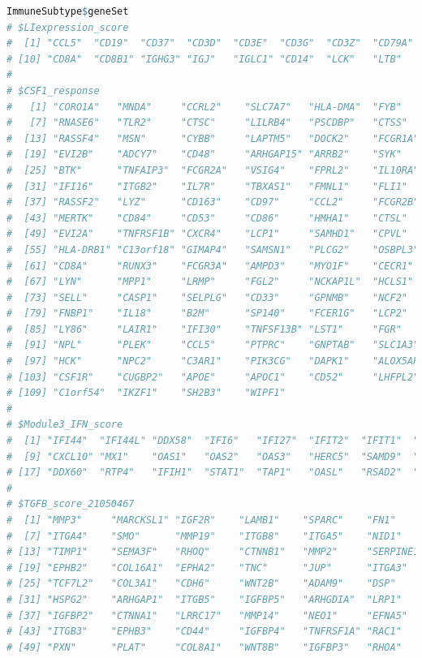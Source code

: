\documentclass[
  12pt,
]{book}
\begin{document}
\begin{lstlisting}[language=R]
ImmuneSubtype$geneSet
# $LIexpression_score
#  [1] "CCL5"  "CD19"  "CD37"  "CD3D"  "CD3E"  "CD3G"  "CD3Z"  "CD79A" "CD79B"
# [10] "CD8A"  "CD8B1" "IGHG3" "IGJ"   "IGLC1" "CD14"  "LCK"   "LTB"   "MS4A1"
# 
# $CSF1_response
#   [1] "CORO1A"   "MNDA"     "CCRL2"    "SLC7A7"   "HLA-DMA"  "FYB"     
#   [7] "RNASE6"   "TLR2"     "CTSC"     "LILRB4"   "PSCDBP"   "CTSS"    
#  [13] "RASSF4"   "MSN"      "CYBB"     "LAPTM5"   "DOCK2"    "FCGR1A"  
#  [19] "EVI2B"    "ADCY7"    "CD48"     "ARHGAP15" "ARRB2"    "SYK"     
#  [25] "BTK"      "TNFAIP3"  "FCGR2A"   "VSIG4"    "FPRL2"    "IL10RA"  
#  [31] "IFI16"    "ITGB2"    "IL7R"     "TBXAS1"   "FMNL1"    "FLI1"    
#  [37] "RASSF2"   "LYZ"      "CD163"    "CD97"     "CCL2"     "FCGR2B"  
#  [43] "MERTK"    "CD84"     "CD53"     "CD86"     "HMHA1"    "CTSL"    
#  [49] "EVI2A"    "TNFRSF1B" "CXCR4"    "LCP1"     "SAMHD1"   "CPVL"    
#  [55] "HLA-DRB1" "C13orf18" "GIMAP4"   "SAMSN1"   "PLCG2"    "OSBPL3"  
#  [61] "CD8A"     "RUNX3"    "FCGR3A"   "AMPD3"    "MYO1F"    "CECR1"   
#  [67] "LYN"      "MPP1"     "LRMP"     "FGL2"     "NCKAP1L"  "HCLS1"   
#  [73] "SELL"     "CASP1"    "SELPLG"   "CD33"     "GPNMB"    "NCF2"    
#  [79] "FNBP1"    "IL18"     "B2M"      "SP140"    "FCER1G"   "LCP2"    
#  [85] "LY86"     "LAIR1"    "IFI30"    "TNFSF13B" "LST1"     "FGR"     
#  [91] "NPL"      "PLEK"     "CCL5"     "PTPRC"    "GNPTAB"   "SLC1A3"  
#  [97] "HCK"      "NPC2"     "C3AR1"    "PIK3CG"   "DAPK1"    "ALOX5AP" 
# [103] "CSF1R"    "CUGBP2"   "APOE"     "APOC1"    "CD52"     "LHFPL2"  
# [109] "C1orf54"  "IKZF1"    "SH2B3"    "WIPF1"   
# 
# $Module3_IFN_score
#  [1] "IFI44"  "IFI44L" "DDX58"  "IFI6"   "IFI27"  "IFIT2"  "IFIT1"  "IFIT3" 
#  [9] "CXCL10" "MX1"    "OAS1"   "OAS2"   "OAS3"   "HERC5"  "SAMD9"  "HERC6" 
# [17] "DDX60"  "RTP4"   "IFIH1"  "STAT1"  "TAP1"   "OASL"   "RSAD2"  "ISG15" 
# 
# $TGFB_score_21050467
#  [1] "MMP3"     "MARCKSL1" "IGF2R"    "LAMB1"    "SPARC"    "FN1"     
#  [7] "ITGA4"    "SMO"      "MMP19"    "ITGB8"    "ITGA5"    "NID1"    
# [13] "TIMP1"    "SEMA3F"   "RHOQ"     "CTNNB1"   "MMP2"     "SERPINE1"
# [19] "EPHB2"    "COL16A1"  "EPHA2"    "TNC"      "JUP"      "ITGA3"   
# [25] "TCF7L2"   "COL3A1"   "CDH6"     "WNT2B"    "ADAM9"    "DSP"     
# [31] "HSPG2"    "ARHGAP1"  "ITGB5"    "IGFBP5"   "ARHGDIA"  "LRP1"    
# [37] "IGFBP2"   "CTNNA1"   "LRRC17"   "MMP14"    "NEO1"     "EFNA5"   
# [43] "ITGB3"    "EPHB3"    "CD44"     "IGFBP4"   "TNFRSF1A" "RAC1"    
# [49] "PXN"      "PLAT"     "COL8A1"   "WNT8B"    "IGFBP3"   "RHOA"    

\end{lstlisting}
\end{document}
